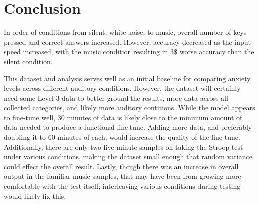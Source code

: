 \documentclass[journal]{IEEEtran}
\begin{document}
\section{Conclusion}
In order of conditions from silent, white noise, to music, overall number of keys pressed and correct answers increased. However, accuracy decreased as the input speed increased, with the music condition resulting in 3\$ worse accuracy than the silent condition.

This dataset and analysis serves well as an initial baseline for comparing anxiety levels across different auditory conditions. However, the dataset will certainly need some Level 3 data to better ground the results, more data across all collected categories, and likely more auditory contitions. While the model appears to fine-tune well, 30 minutes of data is likely close to the minimum amount of data needed to produce a functional fine-tune. Adding more data, and preferably doubling it to 60 minutes of each, would increase the quality of the fine-tune. Additionally, there are only two five-minute samples on taking the Stroop test under various conditions, making the dataset small enough that random variance could effect the overall result. Lastly, though there was an increase in overall output in the familiar music samples, that may have been from growing more comfortable with the test itself; interleaving various conditions during testing would likely fix this.
\end{document}
